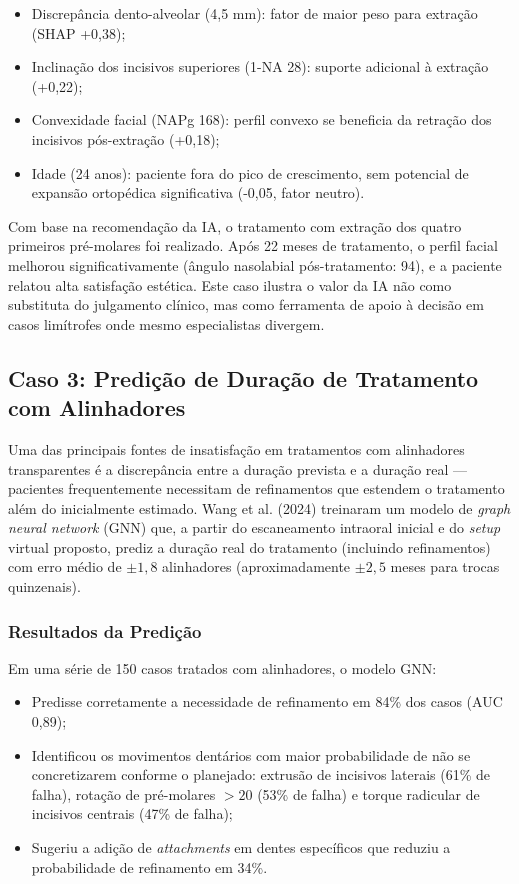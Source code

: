 \begin{itemize}
    \item Discrepância dento-alveolar (4,5 mm): fator de maior peso para extração (SHAP +0,38);
    \item Inclinação dos incisivos superiores (1-NA 28\textdegree{}): suporte adicional à extração (+0,22);
    \item Convexidade facial (NAPg 168\textdegree{}): perfil convexo se beneficia da retração dos incisivos pós-extração (+0,18);
    \item Idade (24 anos): paciente fora do pico de crescimento, sem potencial de expansão ortopédica significativa (-0,05, fator neutro).
\end{itemize}

Com base na recomendação da IA, o tratamento com extração dos quatro primeiros pré-molares foi realizado. Após 22 meses de tratamento, o perfil facial melhorou significativamente (ângulo nasolabial pós-tratamento: 94\textdegree{}), e a paciente relatou alta satisfação estética. Este caso ilustra o valor da IA não como substituta do julgamento clínico, mas como ferramenta de apoio à decisão em casos limítrofes onde mesmo especialistas divergem.

\subsection{Caso 3: Predição de Duração de Tratamento com Alinhadores}

Uma das principais fontes de insatisfação em tratamentos com alinhadores transparentes é a discrepância entre a duração prevista e a duração real --- pacientes frequentemente necessitam de refinamentos que estendem o tratamento além do inicialmente estimado. Wang et al. (2024) treinaram um modelo de \textit{graph neural network} (GNN) que, a partir do escaneamento intraoral inicial e do \textit{setup} virtual proposto, prediz a duração real do tratamento (incluindo refinamentos) com erro médio de $\pm 1,8$ alinhadores (aproximadamente $\pm 2,5$ meses para trocas quinzenais).

\subsubsection{Resultados da Predição}

Em uma série de 150 casos tratados com alinhadores, o modelo GNN:
\begin{itemize}
    \item Predisse corretamente a necessidade de refinamento em 84\% dos casos (AUC 0,89);
    \item Identificou os movimentos dentários com maior probabilidade de não se concretizarem conforme o planejado: extrusão de incisivos laterais (61\% de falha), rotação de pré-molares $>20$\textdegree{} (53\% de falha) e torque radicular de incisivos centrais (47\% de falha);
    \item Sugeriu a adição de \textit{attachments} em dentes específicos que reduziu a probabilidade de refinamento em 34\%.
\end{itemize}

